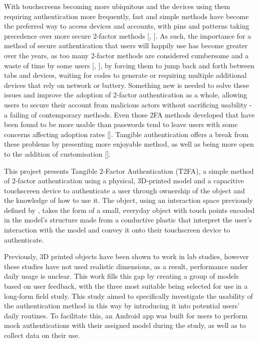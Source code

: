 \documentclass{l4proj}
\begin{document}
With touchscreens becoming more ubiquitous and the devices using them requiring authentication more frequently, fast and simple methods have become the preferred way to access devices and accounts, with pins and patterns taking precedence over more secure 2-factor methods [\cite{colnago2018s}, \cite{reese2019usability}]. As such, the importance for a method of secure authentication that users will happily use has become greater over the years, as too many 2-factor methods are considered cumbersome and a waste of time by some users [\cite{10.1145/3503514}, \cite{das2018johnny}], by forcing them to jump back and forth between tabs and devices, waiting for codes to generate or requiring multiple additional devices that rely on network or battery. Something new is needed to solve these issues and improve the adoption of 2-factor authentication as a whole, allowing users to secure their account from malicious actors without sacrificing usability - a failing of contemporary methods. Even those 2FA methods developed that have been found to be more usable than passwords tend to leave users with some concerns affecting adoption rates [\cite{9152694}]. Tangible authentication offers a break from these problems by presenting more enjoyable method, as well as being more open to the addition of customisation [\cite{sherman2014user}].

This project presents Tangible 2-Factor Authentication (T2FA), a simple method of 2-factor authentication using a physical, 3D-printed model and a capacitive touchscreen device to authenticate a user through ownership of the object and the knowledge of how to use it. The object, using an interaction space previously defined by \cite{marky20203d}, takes the form of a small, everyday object with touch points encoded in the model's structure made from a conductive plastic that interpret the user's interaction with the model and convey it onto their touchscreen device to authenticate. 

Previously, 3D printed objects have been shown to work in lab studies, however these studies have not used realistic dimensions, as a result, performance under daily usage is unclear. This work fills this gap by creating a group of models based on user feedback, with the three most suitable being selected for use in a long-form field study. This study aimed to specifically investigate the usability of the authentication method in this way by introducing it into potential users' daily routines. To facilitate this, an Android app was built for users to perform mock authentications with their assigned model during the study, as well as to collect data on their use.
\end{document}
